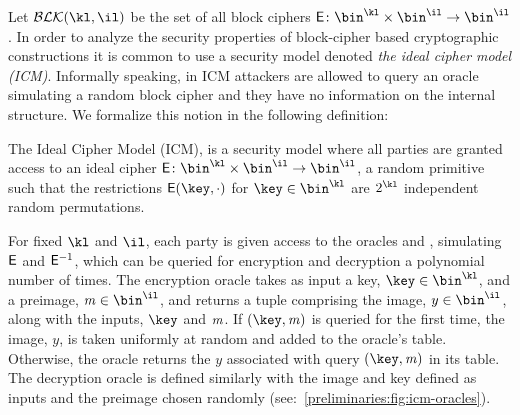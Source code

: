 Let $\blockSet(\kl, \il)$ be the set of all block ciphers $\Enc \colon \bin^{\kl} \times \bin^{\il} \to \bin^{\il}$. In order to analyze the security properties of block-cipher based cryptographic constructions it is common to use a security model denoted \emph{the ideal cipher model (ICM)}. Informally speaking, in ICM attackers are allowed to query an oracle simulating a random block cipher and they have no information on the internal structure. We formalize this notion in the following definition:

\begin{definition}\label{preliminaries:def:ICM}
    The Ideal Cipher Model (ICM), is a security model where all parties are granted access to an ideal cipher $\Enc \colon \bin^{\kl} \times \bin^\il \to \bin^\il$, a random primitive such that the restrictions $\Enc (\key, \cdot )$ for $\key \in \bin^{\kl}$ are $2^{\kl}$ independent random permutations.
\end{definition}

For fixed $\kl$ and $\il$, each party is given access to the oracles \oracleEnc{} and \oracleDec{}, simulating $\mathsf{E}$ and $\mathsf{E}^{-1}$, which can be queried for encryption and decryption a polynomial number of times. The encryption oracle takes as input a key, $\key\in \bin^{\kl}$, and a preimage, $\msg \in \bin^{\il}$, and returns a tuple comprising the image, $y \in \bin^{\il}$, along with the inputs, $\key$ and $\mathit{m}$. If $(\key, \msg)$ is queried for the first time, the image, $y$, is taken uniformly at random and added to the oracle's table. Otherwise, the oracle returns the $y$ associated with query $(\key, \msg)$ in its table. The decryption oracle is defined similarly with the image and key defined as inputs and the preimage chosen randomly (see:~\cref{preliminaries:fig:icm-oracles}).

